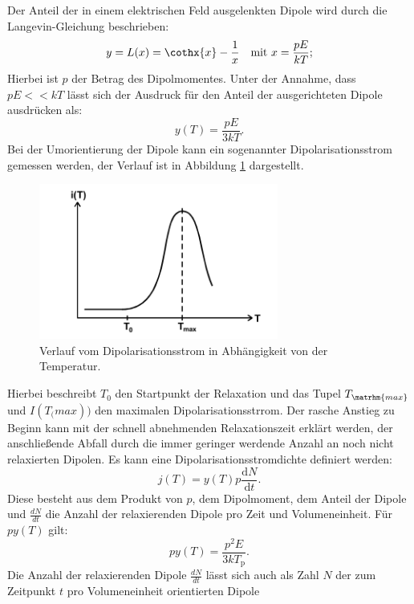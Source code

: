 Der Anteil der in einem elektrischen Feld ausgelenkten Dipole wird durch die Langevin-Gleichung beschrieben:
\begin{align}
  y=L(x)&=\cothx{x}-\frac{1}{x}   &\text{mit}\,\, x=\frac{pE}{kT};
\end{align}
Hierbei ist $p$ der Betrag des Dipolmomentes. Unter der Annahme, dass $pE<<kT$ lässt sich der Ausdruck
für den Anteil der ausgerichteten Dipole ausdrücken als:
\begin{equation}
  y(T)=\frac{pE}{3kT}.
\end{equation}
Bei der Umorientierung der Dipole kann ein sogenannter Dipolarisationsstrom gemessen werden, der Verlauf
ist in Abbildung \ref{fig:strom} dargestellt.
\begin{figure}
    \centering
    \includegraphics[width=0.7\textwidth]{strom.PNG}
    \caption{Verlauf vom Dipolarisationsstrom in Abhängigkeit von der Temperatur.\cite{skript}}
    \label{fig:strom}
\end{figure}
Hierbei beschreibt $T_\mathrm{0}$ den Startpunkt der Relaxation und das
Tupel $T_\matrhm{max}$ und $I(T_\mathrm(max))$ den maximalen Dipolarisationsstrrom.
Der rasche Anstieg zu Beginn kann mit der schnell abnehmenden Relaxationszeit erklärt werden,
der anschließende Abfall durch die immer geringer werdende Anzahl an noch nicht relaxierten Dipolen.
Es kann eine Dipolarisationsstromdichte definiert werden:
\begin{equation}
  j(T)=y(T)p\frac{\mathrm{d}N}{\mathrm{d}t}\label{eqn:stromdichte}.
\end{equation}
Diese besteht aus dem Produkt von $p$, dem Dipolmoment, dem
Anteil der Dipole und $\frac{dN}{dt}$
die Anzahl der relaxierenden Dipole pro Zeit und Volumeneinheit.
Für $py(T)$ gilt:
\begin{equation}
py(T)=\frac{p^2E}{3kT_\mathrm{p}}.\label{eqn:prod}
\end{equation}
Die Anzahl der relaxierenden Dipole $\frac{dN}{dt}$ lässt sich auch als Zahl $N$ der zum Zeitpunkt $t$ pro Volumeneinheit orientierten Dipole

